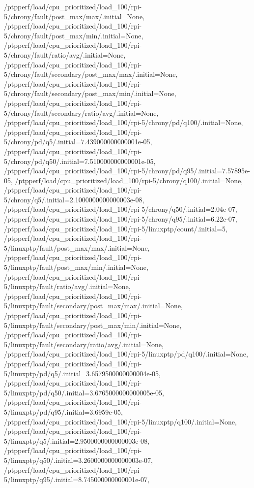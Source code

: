 {    /ptpperf/load/cpu_prioritized/load_100/rpi-5/chrony/fault/post_max/max/.initial=None,
    /ptpperf/load/cpu_prioritized/load_100/rpi-5/chrony/fault/post_max/min/.initial=None,
    /ptpperf/load/cpu_prioritized/load_100/rpi-5/chrony/fault/ratio/avg/.initial=None,
    /ptpperf/load/cpu_prioritized/load_100/rpi-5/chrony/fault/secondary/post_max/max/.initial=None,
    /ptpperf/load/cpu_prioritized/load_100/rpi-5/chrony/fault/secondary/post_max/min/.initial=None,
    /ptpperf/load/cpu_prioritized/load_100/rpi-5/chrony/fault/secondary/ratio/avg/.initial=None,
    /ptpperf/load/cpu_prioritized/load_100/rpi-5/chrony/pd/q100/.initial=None,
    /ptpperf/load/cpu_prioritized/load_100/rpi-5/chrony/pd/q5/.initial=7.439000000000001e-05,
    /ptpperf/load/cpu_prioritized/load_100/rpi-5/chrony/pd/q50/.initial=7.510000000000001e-05,
    /ptpperf/load/cpu_prioritized/load_100/rpi-5/chrony/pd/q95/.initial=7.57895e-05,
    /ptpperf/load/cpu_prioritized/load_100/rpi-5/chrony/q100/.initial=None,
    /ptpperf/load/cpu_prioritized/load_100/rpi-5/chrony/q5/.initial=2.1000000000000003e-08,
    /ptpperf/load/cpu_prioritized/load_100/rpi-5/chrony/q50/.initial=2.04e-07,
    /ptpperf/load/cpu_prioritized/load_100/rpi-5/chrony/q95/.initial=6.22e-07,
    /ptpperf/load/cpu_prioritized/load_100/rpi-5/linuxptp/count/.initial=5,
    /ptpperf/load/cpu_prioritized/load_100/rpi-5/linuxptp/fault/post_max/max/.initial=None,
    /ptpperf/load/cpu_prioritized/load_100/rpi-5/linuxptp/fault/post_max/min/.initial=None,
    /ptpperf/load/cpu_prioritized/load_100/rpi-5/linuxptp/fault/ratio/avg/.initial=None,
    /ptpperf/load/cpu_prioritized/load_100/rpi-5/linuxptp/fault/secondary/post_max/max/.initial=None,
    /ptpperf/load/cpu_prioritized/load_100/rpi-5/linuxptp/fault/secondary/post_max/min/.initial=None,
    /ptpperf/load/cpu_prioritized/load_100/rpi-5/linuxptp/fault/secondary/ratio/avg/.initial=None,
    /ptpperf/load/cpu_prioritized/load_100/rpi-5/linuxptp/pd/q100/.initial=None,
    /ptpperf/load/cpu_prioritized/load_100/rpi-5/linuxptp/pd/q5/.initial=3.6579500000000004e-05,
    /ptpperf/load/cpu_prioritized/load_100/rpi-5/linuxptp/pd/q50/.initial=3.6765000000000005e-05,
    /ptpperf/load/cpu_prioritized/load_100/rpi-5/linuxptp/pd/q95/.initial=3.6959e-05,
    /ptpperf/load/cpu_prioritized/load_100/rpi-5/linuxptp/q100/.initial=None,
    /ptpperf/load/cpu_prioritized/load_100/rpi-5/linuxptp/q5/.initial=2.9500000000000003e-08,
    /ptpperf/load/cpu_prioritized/load_100/rpi-5/linuxptp/q50/.initial=3.2600000000000003e-07,
    /ptpperf/load/cpu_prioritized/load_100/rpi-5/linuxptp/q95/.initial=8.745000000000001e-07,
}
